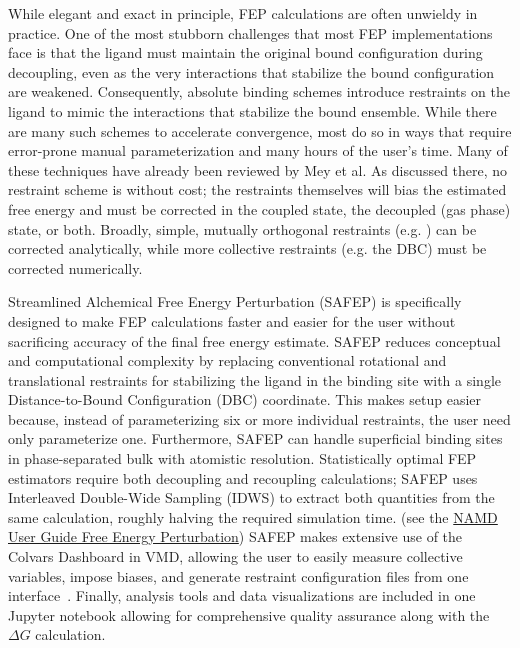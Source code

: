 \documentclass[9pt,tutorial]{Styling/livecoms}
\begin{document}
While elegant and exact in principle, FEP calculations are often unwieldy in practice.
One of the most stubborn challenges that most FEP implementations face is that the ligand must maintain the original bound configuration during decoupling, even as the very interactions that stabilize the bound configuration are weakened.
Consequently, absolute binding schemes introduce restraints on the ligand to mimic the interactions that stabilize the bound ensemble. 
While there are many such schemes to accelerate convergence,\cite{Henin2017,Hermans1997,Boresch2003, Fu2017} most do so in ways that require error-prone manual parameterization and many hours of the user's time.
Many of these techniques have already been reviewed by Mey et al. \cite{Mey2020} 
As discussed there, no restraint scheme is without cost; the restraints themselves will bias the estimated free energy and must be corrected in the coupled state, the decoupled (gas phase) state, or both.
Broadly, simple, mutually orthogonal restraints (e.g. \cite{Boresch2003, Salari2018}) can be corrected analytically, while more collective restraints (e.g. the DBC) must be corrected numerically.\cite{Salari2018, Fu2017}

Streamlined Alchemical Free Energy Perturbation (SAFEP) is specifically designed to make FEP calculations faster and easier for the user without sacrificing accuracy of the final free energy estimate.
SAFEP reduces conceptual and computational complexity by replacing conventional rotational and translational restraints for stabilizing the ligand in the binding site with a single Distance-to-Bound Configuration (DBC) coordinate.
This makes setup easier because, instead of parameterizing six or more individual restraints, the user need only parameterize one.
Furthermore, SAFEP can handle superficial binding sites in phase-separated bulk with atomistic resolution. \cite{Salari2018}
Statistically optimal FEP estimators require both decoupling and recoupling calculations; SAFEP uses Interleaved Double-Wide Sampling (IDWS) to extract both quantities from the same calculation, roughly halving the required simulation time. \cite{Bernardi2020} (see the \href{https://www.ks.uiuc.edu/Research/namd/2.14/ug/node64.html}{NAMD User Guide Free Energy Perturbation})
SAFEP makes extensive use of the Colvars Dashboard in VMD, allowing the user to easily measure collective variables, impose biases, and generate restraint configuration files from one interface~\cite{Henin2022}. 
Finally, analysis tools and data visualizations are included in one Jupyter notebook allowing for comprehensive quality assurance along with the $\Delta G$ calculation.
\end{document}
